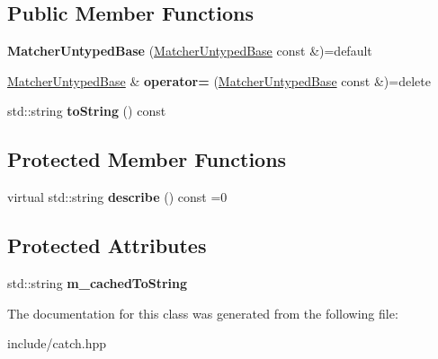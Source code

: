 \subsection*{Public Member Functions}
\begin{DoxyCompactItemize}
\item 
{\bfseries Matcher\+Untyped\+Base} (\hyperlink{classCatch_1_1Matchers_1_1Impl_1_1MatcherUntypedBase}{Matcher\+Untyped\+Base} const \&)=default\hypertarget{classCatch_1_1Matchers_1_1Impl_1_1MatcherUntypedBase_a985fd3c3ffcc9f2e8dc7a330130040b0}{}\label{classCatch_1_1Matchers_1_1Impl_1_1MatcherUntypedBase_a985fd3c3ffcc9f2e8dc7a330130040b0}

\item 
\hyperlink{classCatch_1_1Matchers_1_1Impl_1_1MatcherUntypedBase}{Matcher\+Untyped\+Base} \& {\bfseries operator=} (\hyperlink{classCatch_1_1Matchers_1_1Impl_1_1MatcherUntypedBase}{Matcher\+Untyped\+Base} const \&)=delete\hypertarget{classCatch_1_1Matchers_1_1Impl_1_1MatcherUntypedBase_a62668ccc47b64a9094dcb6413f9af80b}{}\label{classCatch_1_1Matchers_1_1Impl_1_1MatcherUntypedBase_a62668ccc47b64a9094dcb6413f9af80b}

\item 
std\+::string {\bfseries to\+String} () const \hypertarget{classCatch_1_1Matchers_1_1Impl_1_1MatcherUntypedBase_a9667f989b08e52a1ce96c955456db8f9}{}\label{classCatch_1_1Matchers_1_1Impl_1_1MatcherUntypedBase_a9667f989b08e52a1ce96c955456db8f9}

\end{DoxyCompactItemize}
\subsection*{Protected Member Functions}
\begin{DoxyCompactItemize}
\item 
virtual std\+::string {\bfseries describe} () const =0\hypertarget{classCatch_1_1Matchers_1_1Impl_1_1MatcherUntypedBase_a91d3a907dbfcbb596077df24f6e11fe2}{}\label{classCatch_1_1Matchers_1_1Impl_1_1MatcherUntypedBase_a91d3a907dbfcbb596077df24f6e11fe2}

\end{DoxyCompactItemize}
\subsection*{Protected Attributes}
\begin{DoxyCompactItemize}
\item 
std\+::string {\bfseries m\+\_\+cached\+To\+String}\hypertarget{classCatch_1_1Matchers_1_1Impl_1_1MatcherUntypedBase_a951095c462657e7097a9a6dc4dde813f}{}\label{classCatch_1_1Matchers_1_1Impl_1_1MatcherUntypedBase_a951095c462657e7097a9a6dc4dde813f}

\end{DoxyCompactItemize}


The documentation for this class was generated from the following file\+:\begin{DoxyCompactItemize}
\item 
include/catch.\+hpp\end{DoxyCompactItemize}
